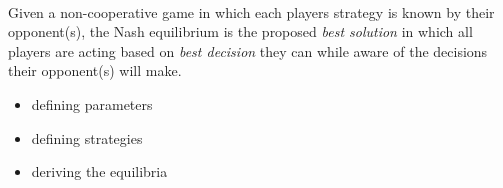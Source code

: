 \paragraph{} Given a non-cooperative game in which each players strategy is known by their opponent(s), the Nash equilibrium is the proposed \textit{best solution} in which all players are acting based on \textit{best decision} they can while aware of the decisions their opponent(s) will make.

\begin{itemize}
  \item defining parameters
  \item defining strategies
  \item deriving the equilibria
\end{itemize}